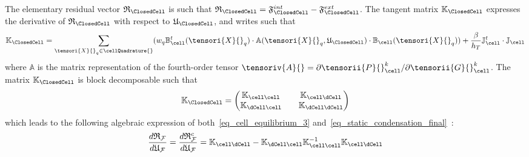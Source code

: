 The elementary residual vector $\mathfrak{R}_{\ClosedCell}$ is such
that $\mathfrak{R}_{\ClosedCell} =
\mathfrak{F}_{\ClosedCell}^{int} -
\mathfrak{F}_{\ClosedCell}^{ext}$. The tangent matrix
$\mathbb{K}_{\ClosedCell}$ expresses the
derivative of $\mathfrak{R}_{\ClosedCell}$
with respect to $\mathfrak{U}{}_{\ClosedCell}$, and writes such that
%
%
%
\begin{equation}
  \label{eq_stiffness_operator}
  \begin{aligned}
    \mathbb{K}_{\ClosedCell}
    = \sum_{\tensori{X}{}_q \in \cellQuadrature{}} (w_q
    {\mathbb{B}}{}_{\cell}^{t}(\tensori{X}{}_q) \cdot
    \mathbb{A}(\tensori{X}{}_q, \mathfrak{U}{}_{\ClosedCell}) \cdot
    {\mathbb{B}}{}_{\cell}(\tensori{X}{}_q) ) + \frac{\beta}{h_T}
    {\mathbb{J}}{}_{\cell}^t \cdot {\mathbb{J}}{}_{\cell}
  \end{aligned}
\end{equation}
%
%
%
where $\mathbb{A}$ is the matrix representation of the
fourth-order tensor $\tensoriv{A}{} = \partial \tensorii{P}{}_{\cell}^k
/ \partial \tensorii{G}{}_{\cell}^k$. The matrix
$\mathbb{K}_{\ClosedCell}$ is block
decomposable such that
%
%
%
\begin{equation}
  \label{eq_stiffness_operator_blocks}
  \begin{aligned}
    \mathbb{K}_{\ClosedCell}
    =
    \begin{pmatrix}
      \mathbb{K}_{\cell
        \cell} && \mathbb{K}_{\cell
        \dCell} \\
      \mathbb{K}_{\dCell
        \cell} && \mathbb{K}_{\dCell
        \dCell}
    \end{pmatrix}
  \end{aligned}
\end{equation}
%
%
%
which leads to the following algebraic expression of
both~\eqref{eq_cell_equilibrium_3}
and~\eqref{eq_static_condensation_final}~:
\begin{equation}
  \label{eq_condensation_matrix}
  \begin{aligned}
    \frac{d \mathfrak{R}_{\mathcal{F}}}{d
      \mathfrak{U}_{\mathcal{F}}} = \frac{d
      \mathfrak{R}_{\mathcal{F}}^c}{d \mathfrak{U}_{\mathcal{F}}} =
    \mathbb{K}_{\cell \dCell} -
    \mathbb{K}_{\dCell \cell}
    \mathbb{K}_{\cell \cell}^{-1}
    \mathbb{K}_{\cell \dCell}
  \end{aligned}
\end{equation}

